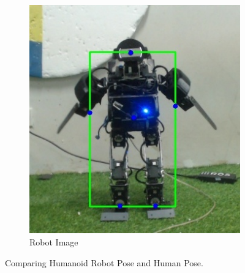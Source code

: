 \begin{figure}
\begin{subfigure}[b]{0.4\textwidth}
      \includegraphics[width=\textwidth]{gambar/robot_6_result.jpg}
      \caption{Robot Image}
      \label{fig:robotimagea}
  \end{subfigure}
     \caption{Comparing Humanoid Robot Pose and Human Pose.}
     \label{fig:comparinga}
\end{figure}

